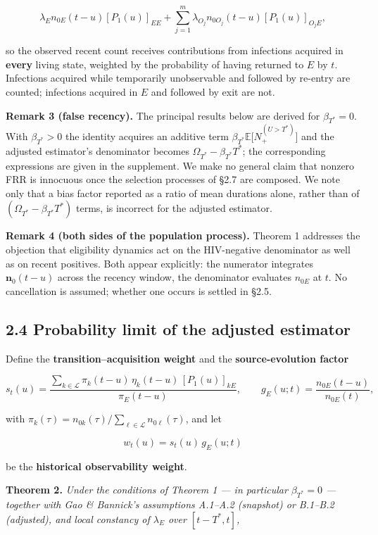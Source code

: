 \[
\lambda_E n_{0E}(t-u)[P_1(u)]_{EE}
+\sum_{j=1}^{m}\lambda_{O_j} n_{0O_j}(t-u)[P_1(u)]_{O_jE},
\]

so the observed recent count receives contributions from infections acquired in \textbf{every} living state, weighted by the probability of having returned to \(E\) by \(t\). Infections acquired while temporarily unobservable and followed by re-entry are counted; infections acquired in \(E\) and followed by exit are not.

\textbf{Remark 3 (false recency).} The principal results below are derived for \(\beta_{T^*}=0\). With \(\beta_{T^*}>0\) the identity acquires an additive term \(\beta_{T^*}\mathbb{E}\big[N_+^{(U>T^*)}\big]\) and the adjusted estimator's denominator becomes \(\Omega_{T^*}-\beta_{T^*}T^*\); the corresponding expressions are given in the supplement. We make no general claim that nonzero FRR is innocuous once the selection processes of §2.7 are composed. We note only that a bias factor reported as a ratio of mean durations alone, rather than of \((\Omega_{T^*}-\beta_{T^*}T^*)\) terms, is incorrect for the adjusted estimator.

\textbf{Remark 4 (both sides of the population process).} Theorem 1 addresses the objection that eligibility dynamics act on the HIV-negative denominator as well as on recent positives. Both appear explicitly: the numerator integrates \(\mathbf{n}_0(t-u)\) across the recency window, the denominator evaluates \(n_{0E}\) at \(t\). No cancellation is assumed; whether one occurs is settled in §2.5.

\subsection{2.4 Probability limit of the adjusted estimator}

Define the \textbf{transition--acquisition weight} and the \textbf{source-evolution factor}

\[
s_t(u)
=
\frac{\displaystyle\sum_{k\in\mathcal{L}}\pi_k(t-u)\,\eta_k(t-u)\,[P_1(u)]_{kE}}{\pi_E(t-u)},
\qquad
g_E(u;t)=\frac{n_{0E}(t-u)}{n_{0E}(t)},
\]

with \(\pi_k(\tau)=n_{0k}(\tau)/\sum_{\ell\in\mathcal{L}}n_{0\ell}(\tau)\), and let

\[
\boxed{\;w_t(u) = s_t(u)\,g_E(u;t)\;}
\]

be the \textbf{historical observability weight}.

\textbf{Theorem 2.} \emph{Under the conditions of Theorem 1 --- in particular \(\beta_{T^*}=0\) --- together with Gao \& Bannick's assumptions A.1--A.2 (snapshot) or B.1--B.2 (adjusted), and local constancy of \(\lambda_E\) over \([t-T^*,t]\),}

